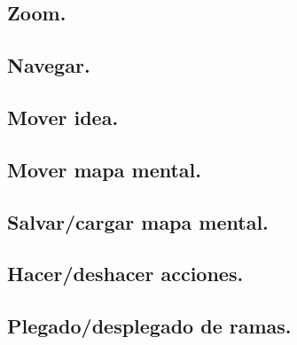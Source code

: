 \subsection{Zoom.}

\subsection{Navegar.}

\subsection{Mover idea.}

\subsection{Mover mapa mental.}

\subsection{Salvar/cargar mapa mental.}

\subsection{Hacer/deshacer acciones.}

\subsection{Plegado/desplegado de ramas.}